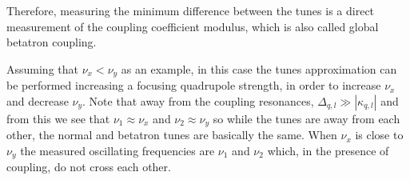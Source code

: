 Therefore, measuring the minimum difference between the tunes is a direct measurement of the coupling coefficient modulus, which is also called global betatron coupling. 

Assuming that $\nu_x < \nu_y$ as an example, in this case the tunes approximation can be performed increasing a focusing quadrupole strength, in order to increase $\nu_x$ and decrease $\nu_y$. Note that away from the coupling resonances, $\Delta_{q, l} \gg |\kappa_{q, l}|$ and from this we see that $\nu_1 \approx \nu_x$ and $\nu_2 \approx \nu_y$ so while the tunes are away from each other, the normal and betatron tunes are basically the same. When $\nu_x$ is close to $\nu_y$ the measured oscillating frequencies are $\nu_1$ and $\nu_2$ which, in the presence of coupling, do not cross each other.








